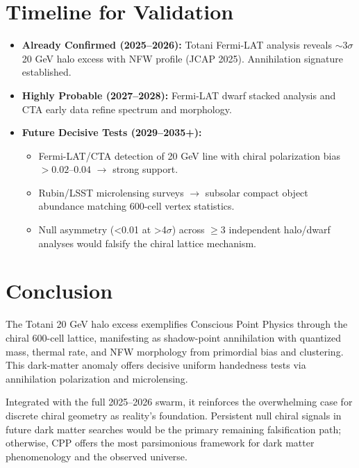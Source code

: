\documentclass[11pt]{article}
\begin{document}
\section{Timeline for Validation}
\begin{itemize}
    \item \textbf{Already Confirmed (2025--2026):} Totani Fermi-LAT analysis reveals $\sim$3$\sigma$ 20 GeV halo excess with NFW profile (JCAP 2025). Annihilation signature established.
    \item \textbf{Highly Probable (2027--2028):} Fermi-LAT dwarf stacked analysis and CTA early data refine spectrum and morphology.
    \item \textbf{Future Decisive Tests (2029--2035+):}
    \begin{itemize}
        \item Fermi-LAT/CTA detection of 20 GeV line with chiral polarization bias $>0.02$--$0.04$ $\to$ strong support.
        \item Rubin/LSST microlensing surveys $\to$ subsolar compact object abundance matching 600-cell vertex statistics.
        \item Null asymmetry (<0.01 at >4$\sigma$) across $\geq 3$ independent halo/dwarf analyses would falsify the chiral lattice mechanism.
    \end{itemize}
\end{itemize}

\section{Conclusion}
The Totani 20 GeV halo excess exemplifies Conscious Point Physics through the chiral 600-cell lattice, manifesting as shadow-point annihilation with quantized mass, thermal rate, and NFW morphology from primordial bias and clustering. This dark-matter anomaly offers decisive uniform handedness tests via annihilation polarization and microlensing.  

Integrated with the full 2025--2026 swarm, it reinforces the overwhelming case for discrete chiral geometry as reality's foundation. Persistent null chiral signals in future dark matter searches would be the primary remaining falsification path; otherwise, CPP offers the most parsimonious framework for dark matter phenomenology and the observed universe.
\end{document}
